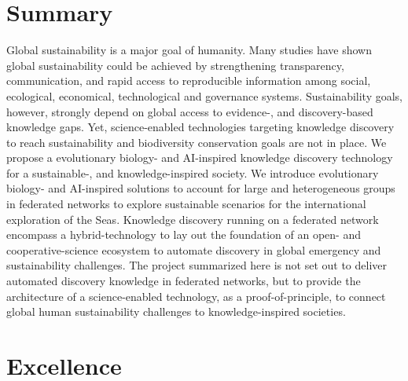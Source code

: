 \documentclass[11pt, a4paper]{article} %
\begin{document}
\section*{{\bf Summary}} Global sustainability is a major goal of
humanity. Many studies have shown global sustainability could be
achieved by strengthening transparency, communication, and rapid
access to reproducible information among social, ecological,
economical, technological and governance systems. Sustainability
goals, however, strongly depend on global access to evidence-, and
discovery-based knowledge gaps. Yet, science-enabled technologies
targeting knowledge discovery to reach sustainability and biodiversity
conservation goals are not in place. We propose a evolutionary
biology- and AI-inspired knowledge discovery technology for a
sustainable-, and knowledge-inspired society. We introduce
evolutionary biology- and AI-inspired solutions to account for large and
heterogeneous groups in federated networks to explore sustainable
scenarios for the international exploration of the Seas. Knowledge
discovery running on a federated network encompass a hybrid-technology
to lay out the foundation of an open- and cooperative-science
ecosystem to automate discovery in global emergency and sustainability
challenges. The project summarized here is not set out to deliver
automated discovery knowledge in federated networks, but to provide
the architecture of a science-enabled technology, as a
proof-of-principle, to connect global human sustainability challenges
to knowledge-inspired societies.
\section{Excellence}
\end{document}
